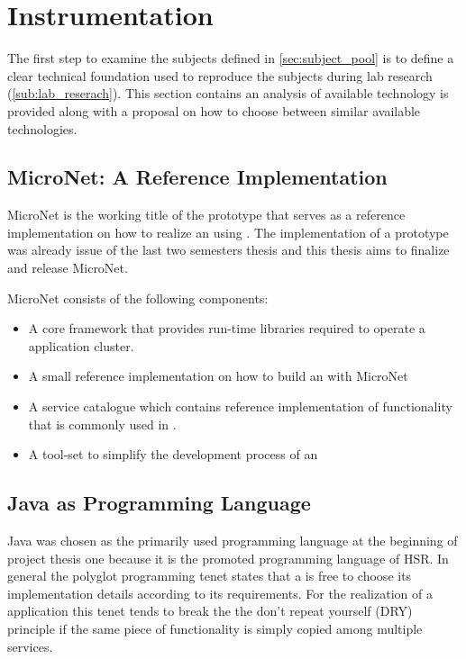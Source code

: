 \section{Instrumentation}
\label{sub:instrumentation}

The first step to examine the subjects defined in \autoref{sec:subject_pool} is
to define a clear technical foundation used to reproduce the subjects during lab
research (\autoref{sub:lab_reserach}). This section contains an analysis of
available technology is provided along with a proposal on how to choose between
similar available technologies.

\subsection{MicroNet: A Reference Implementation}

MicroNet is the working title of the prototype that serves as a reference
implementation on how to realize an \og{} using \ms{}. The implementation of a
prototype was already issue of the last two semesters thesis and this thesis
aims to finalize and release MicroNet.

MicroNet consists of the following components:

\begin{itemize}
  \item A core framework that provides run-time libraries required to operate a
  \ms{} \og{} application cluster.
  \item A small reference implementation on how to build an \og{} with MicroNet
  \item A service catalogue which contains reference implementation of
  functionality that is commonly used in \ogs{}.
  \item A tool-set to simplify the development process of an \og{} 
\end{itemize}

\subsection{Java as Programming Language}

Java was chosen as the primarily used programming language at the beginning of
project thesis one because it is the promoted programming language of HSR. In
general the polyglot programming tenet states that a \ms{} is free to choose its
implementation details according to its requirements. For the realization of a
\ms{} application this tenet tends to break the the don't repeat yourself (DRY)
principle if the same piece of functionality is simply copied among multiple
services.

